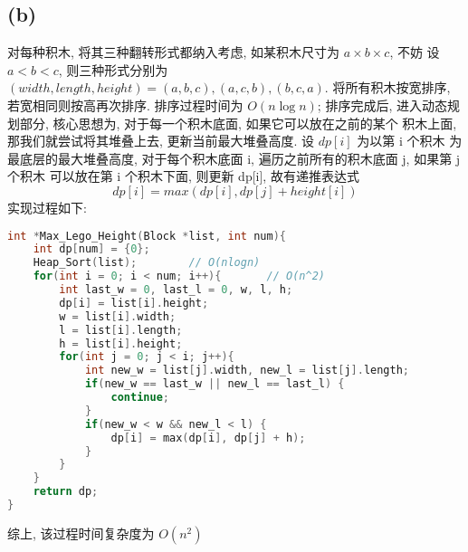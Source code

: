 \documentclass[UTF8]{ctexart}
\begin{document}
\begin{sloppypar}
\subsection*{(b)}
对每种积木, 将其三种翻转形式都纳入考虑, 如某积木尺寸为 $a\times b\times c$, 不妨
设 $a < b < c$, 则三种形式分别为 $(width, length, height) = (a,b,c), (a,c,b),
(b,c,a)$. 将所有积木按宽排序, 若宽相同则按高再次排序. 排序过程时间为 $O(n\log n)$;
排序完成后, 进入动态规划部分, 核心思想为, 对于每一个积木底面, 如果它可以放在之前的某个
积木上面, 那我们就尝试将其堆叠上去, 更新当前最大堆叠高度. 设 $dp[i]$ 为以第 i 个积木
为最底层的最大堆叠高度, 对于每个积木底面 i, 遍历之前所有的积木底面 j, 如果第 j 个积木
可以放在第 i 个积木下面, 则更新 dp[i], 故有递推表达式
\[dp[i] = max(dp[i], dp[j] + height[i])\]
实现过程如下:
\begin{lstlisting}[language=C]  
int *Max_Lego_Height(Block *list, int num){
    int dp[num] = {0};
    Heap_Sort(list);        // O(nlogn)
    for(int i = 0; i < num; i++){       // O(n^2)
        int last_w = 0, last_l = 0, w, l, h;
        dp[i] = list[i].height;
        w = list[i].width;
        l = list[i].length;
        h = list[i].height;
        for(int j = 0; j < i; j++){
            int new_w = list[j].width, new_l = list[j].length;
            if(new_w == last_w || new_l == last_l) {
                continue;
            }
            if(new_w < w && new_l < l) {
                dp[i] = max(dp[i], dp[j] + h);
            }
        }
    }
    return dp; 
}
\end{lstlisting}
综上, 该过程时间复杂度为 $O(n^2)$
\end{sloppypar}
\end{document}
